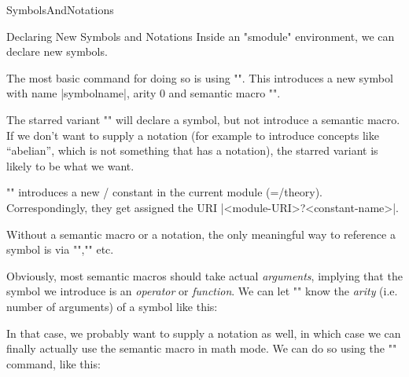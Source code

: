 \begin{smodule}[ns=https://github.com/slatex/sTeX/doc]{SymbolsAndNotations}
\begin{sfragment}{Declaring New Symbols and Notations}
    Inside an \stexcode"smodule" environment, we can declare new
    \sTeX symbols.

    \begin{function}{\symdecl}
        The most basic command for doing so is using
        \stexcode"". This introduces
        a new symbol with name |symbolname|, arity $0$ and 
        semantic macro \stexcode"\symbolname".

        The starred variant \stexcode"" will
        declare a symbol, but not introduce a semantic macro.
        If we don't want to supply a notation (for example to introduce
        concepts like ``abelian'', which is not something that
        has a notation), the starred variant is likely to be what we
        want.
    \end{function}
    \begin{mmtbox}
        \stexcode"\symdecl" introduces a new \omdoc/\mmt
        constant in the current module (=\omdoc/\mmt theory).
        Correspondingly, they get assigned the URI 
        |<module-URI>?<constant-name>|.
    \end{mmtbox}

    Without a semantic macro or a notation, the only 
    meaningful way to reference a symbol
    is via \stexcode"\symref",\stexcode"\symname" etc.


    Obviously, most semantic macros should take actual \emph{arguments},
    implying that the symbol we introduce is an \emph{operator} or
    \emph{function}. We can let \stexcode"\symdecl" know the
    \emph{arity} (i.e. number of arguments) of a symbol like this:


    \begin{function}{\notation}
        In that case, we probably want to supply a notation as well,
        in which case we can finally actually use 
        the semantic macro in math mode.
        We can do so using the \stexcode"\notation" command, like this:
    \end{function}


\end{sfragment}
\end{smodule}
